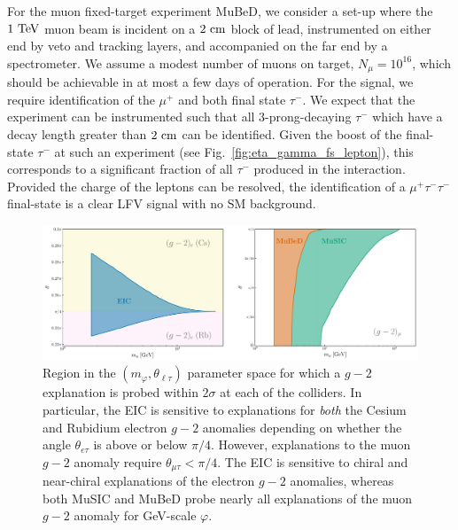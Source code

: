 For the muon fixed-target experiment MuBeD, we consider a set-up where the $1~{\rm TeV}$ muon beam is incident on a $2~{\rm cm}$ block of lead, instrumented on either end by veto and tracking layers, and accompanied on the far end by a spectrometer. We assume a modest number of muons on target, $N_{\mu} = 10^{16}$, which should be achievable in at most a few days of operation. For the signal, we require identification of the $\mu^+$ and both final state $\tau^-$. We expect that the experiment can be instrumented such that all 3-prong-decaying $\tau^-$ which have a decay length greater than $2~{\rm cm}$ can be identified. Given the boost of the final-state $\tau^-$ at such an experiment (see Fig.~\ref{fig:eta_gamma_fs_lepton}), this corresponds to a significant fraction of all $\tau^-$ produced in the interaction. Provided the charge of the leptons can be resolved, the identification of a $\mu^+\tau^-\tau^-$ final-state is a clear LFV signal with no SM background. 
\begin{figure}[t!]
    \centering
    \includegraphics[width=\linewidth]{figures/chapter4/scalar_g_2_experiment_probes.pdf}
    \caption[Region in the $(m_\varphi, \theta_{\ell\tau})$ parameter space for which an LFV scalar $g-2$ explanation is probed within $2\sigma$ at various lepton-nucleus collision experiments.]{Region in the $(m_\varphi, \theta_{\ell\tau})$ parameter space for which a $g-2$ explanation is probed within $2\sigma$ at each of the colliders. In particular, the EIC is sensitive to explanations for {\it both} the Cesium and Rubidium electron $g-2$ anomalies depending on whether the angle $\theta_{e\tau}$ is above or below $\pi/4$. However, explanations to the muon $g-2$ anomaly require $\theta_{\mu\tau} < \pi/4$. The EIC is sensitive to chiral and near-chiral explanations of the electron $g-2$ anomalies, whereas both MuSIC and MuBeD probe nearly all explanations of the muon $g-2$ anomaly for GeV-scale $\varphi$.}
    \label{fig:scalar_explanations}
\end{figure}

